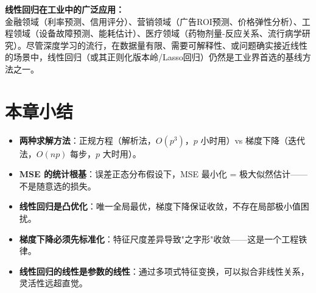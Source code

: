 \documentclass[a4paper,11pt]{ctexart}
\begin{document}
\begin{appbox}[现实应用场景]
    \textbf{线性回归在工业中的广泛应用：}\\
    金融领域（利率预测、信用评分）、营销领域（广告ROI预测、价格弹性分析）、工程领域（设备故障预测、能耗估计）、医疗领域（药物剂量-反应关系、流行病学研究）。尽管深度学习的流行，在数据量有限、需要可解释性、或问题确实接近线性的场景中，线性回归（或其正则化版本岭/Lasso回归）仍然是工业界首选的基线方法之一。
\end{appbox}

\section{本章小结}
\begin{itemize}
    \item \textbf{两种求解方法}：正规方程（解析法，$O(p^3)$，$p$ 小时用）vs 梯度下降（迭代法，$O(np)$ 每步，$p$ 大时用）。
    \item \textbf{MSE 的统计根基}：误差正态分布假设下，MSE 最小化 = 极大似然估计——不是随意选的损失。
    \item \textbf{线性回归是凸优化}：唯一全局最优，梯度下降保证收敛，不存在局部极小值困扰。
    \item \textbf{梯度下降必须先标准化}：特征尺度差异导致"之字形"收敛——这是一个工程铁律。
    \item \textbf{线性回归的线性是参数的线性}：通过多项式特征变换，可以拟合非线性关系，灵活性远超直觉。
\end{itemize}
\end{document}

